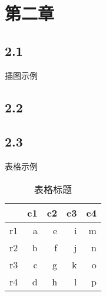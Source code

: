 


\section{第二章}
\subsection{2.1}
\begin{frame}{插图示例}
\end{frame}

\subsection{2.2}

\subsection{2.3}
\begin{frame}{表格示例}
\begin{table}[htbp]
  \centering
  \caption{表格标题}
    \begin{tabular}{rrrrr}
    \addlinespace
    \toprule
          & c1    & c2    & c3    & c4 \\
    \midrule
    r1    & a     & e     & i     & m \\
    r2    & b     & f     & j     & n \\
    r3    & c     & g     & k     & o \\
    r4    & d     & h     & l     & p \\
    \bottomrule
    \end{tabular}%
  \label{tab:addlabel}%
\end{table}%
\end{frame}

